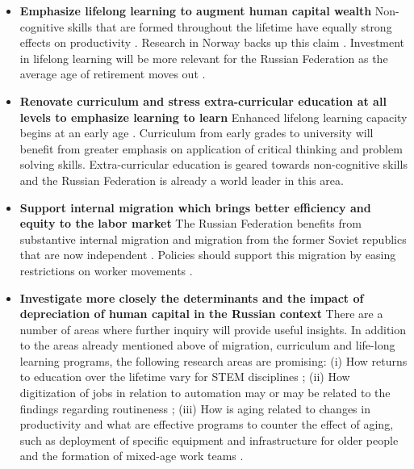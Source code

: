 \documentclass[alpha-refs]{wiley-article-02b}
\begin{document}
\begin{itemize}

\item  \textbf{Emphasize lifelong learning to augment human 
capital 
wealth} Non-cognitive skills that are 
formed throughout the lifetime have equally strong effects on productivity  
\parencite{kautz2014}. Research in Norway backs up this claim 
\parencite{midtsundstad2019}. Investment in lifelong learning will be more 
relevant for the Russian Federation as the average age of retirement moves 
out \parencite{kilpi2012, paccagnella2016}.
 

\item \textbf{Renovate curriculum and stress extra-curricular education at 
all levels to emphasize 
learning to learn} Enhanced lifelong learning capacity begins at an early 
age \parencite{kautz2014}. Curriculum from early grades to university will 
benefit from greater emphasis on application of critical thinking and 
problem solving skills. Extra-curricular education is geared towards 
non-cognitive skills and the Russian Federation is already a world leader 
in this area. 

\item  \textbf{Support internal migration which brings better efficiency 
and equity to the labor market} The Russian Federation benefits from 
substantive internal migration and migration from the former Soviet 
republics that are now independent \parencite{tarasyev2018}. Policies 
should support this migration by easing restrictions on worker movements 
\parencite{oshchepkov2015}. 

\item \textbf{Investigate more closely the determinants and the impact of 
depreciation of human capital in the Russian context} There are a number of 
areas where further inquiry will provide useful insights. In addition to 
the areas already mentioned above of migration, curriculum and life-long 
learning programs, the following research areas are promising: (i) How 
returns to education over the lifetime vary for STEM disciplines 
\parencite{deming2018}; (ii) How digitization of jobs in relation to 
automation may or may be related to the findings regarding routineness 
\parencite{evangelista2014,cirillo2019}; (iii) How is aging related to 
changes in productivity and what are effective programs to counter the 
effect of aging, such as deployment of specific equipment and 
infrastructure for older people and the formation of mixed-age work teams 
\parencite{gobel2009,gobel2013}.



\end{itemize}
\end{document}
